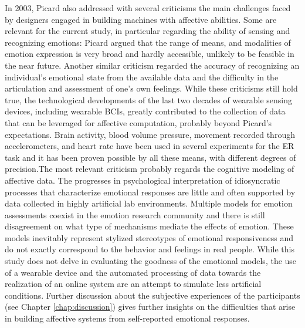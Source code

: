 In 2003, Picard also addressed with several criticisms the main challenges \cite{picard_affective_2003} faced by designers engaged in building machines with affective abilities. Some are relevant for the current study, in particular regarding the ability of sensing and recognizing emotions: Picard argued that the range of means, and modalities of emotion expression is very broad and hardly accessible, unlikely to be feasible in the near future. Another similar criticism regarded the accuracy of recognizing an individual’s emotional state from the available data and the difficulty in the articulation and assessment of one’s own feelings. While these criticisms still hold true, the technological developments of the last two decades of wearable sensing devices, including wearable \ac{BCIs}, greatly contributed to the collection of data that can be leveraged for affective computation, probably beyond Picard’s expectations. Brain activity, blood volume pressure, movement recorded through accelerometers, and heart rate have been used in several experiments for the \ac{ER} task and it has been proven possible by all these means, with different degrees of precision.The most relevant criticism probably regards the cognitive modeling of affective data. The progresses in psychological interpretation of idiosyncratic processes that characterize emotional responses are little and often supported by data collected in highly artificial lab environments. Multiple models for emotion assessments coexist in the emotion research community and there is still disagreement on what type of mechanisms mediate the effects of emotion. These models inevitably represent stylized stereotypes of emotional responsiveness and do not exactly correspond to the behavior and feelings in real people. While this study does not delve in evaluating the goodness of the emotional models, the use of a wearable device and the automated processing of data towards the realization of an online system are an attempt to simulate less artificial conditions. Further discussion about the subjective experiences of the participants (see Chapter \ref{chap:discussion}) gives further insights on the difficulties that arise in building affective systems from self-reported emotional responses.

